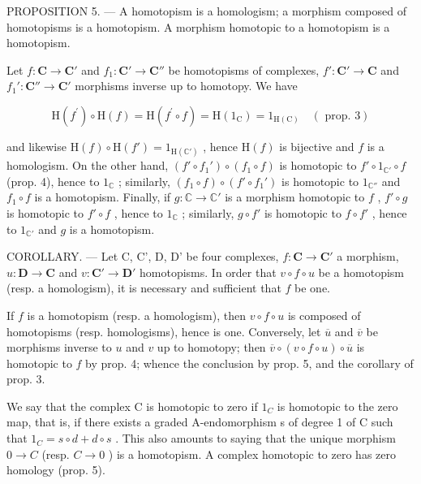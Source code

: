 PROPOSITION 5. — A homotopism is a homologism; a morphism composed of homotopisms is a homotopism. A morphism homotopic to a homotopism is a homotopism.

Let \(f: \mathbf{C} \to \mathbf{C}'\) and \(f_1: \mathbf{C}' \to \mathbf{C}''\) be homotopisms of complexes, \(f': \mathbf{C}' \to \mathbf{C}\) and \(f_1': \mathbf{C}'' \to \mathbf{C}'\) morphisms inverse up to homotopy. We have

\[
\mathrm{H} (f ^ {\prime}) \circ \mathrm{H} (f) = \mathrm{H} (f ^ {\prime} \circ f) = \mathrm{H} (1 _ {\mathrm{C}}) = 1 _ {\mathrm{H(C)}} \quad (\text { prop. } 3)
\]

and likewise \(\mathrm{H}(f) \circ \mathrm{H}(f') = 1_{\mathrm{H}(\mathbb{C}')}\) , hence \(\mathrm{H}(f)\) is bijective and \(f\) is a homologism. On the other hand, \((f' \circ f_1') \circ (f_1 \circ f)\) is homotopic to \(f' \circ 1_{\mathbb{C}'} \circ f\) (prop. 4), hence to \(1_{\mathbb{C}}\) ; similarly, \((f_1 \circ f) \circ (f' \circ f_1')\) is homotopic to \(1_{\mathbb{C}''}\) and \(f_1 \circ f\) is a homotopism. Finally, if \(g: \mathbb{C} \to \mathbb{C}'\) is a morphism homotopic to \(f\) , \(f' \circ g\) is homotopic to \(f' \circ f\) , hence to \(1_{\mathbb{C}}\) ; similarly, \(g \circ f'\) is homotopic to \(f \circ f'\) , hence to \(1_{\mathbb{C}'}\) and \(g\) is a homotopism.

COROLLARY. --- Let C, C', D, D' be four complexes, \(f: \mathbf{C} \to \mathbf{C}'\) a morphism, \(u: \mathbf{D} \to \mathbf{C}\) and \(v: \mathbf{C}' \to \mathbf{D}'\) homotopisms. In order that \(v \circ f \circ u\) be a homotopism (resp. a homologism), it is necessary and sufficient that \(f\) be one.

If \(f\) is a homotopism (resp. a homologism), then \(v \circ f \circ u\) is composed of homotopisms (resp. homologisms), hence is one. Conversely, let \(\overline{u}\) and \(\overline{v}\) be morphisms inverse to \(u\) and \(v\) up to homotopy; then \(\overline{v} \circ (v \circ f \circ u) \circ \overline{u}\) is homotopic to \(f\) by prop. 4; whence the conclusion by prop. 5, and the corollary of prop. 3.

We say that the complex C is homotopic to zero if \(1_{C}\) is homotopic to the zero map, that is, if there exists a graded A-endomorphism s of degree 1 of C such that \(1_{C} = s \circ d + d \circ s\) . This also amounts to saying that the unique morphism \(0 \to C\) (resp. \(C \to 0\) ) is a homotopism. A complex homotopic to zero has zero homology (prop. 5).

